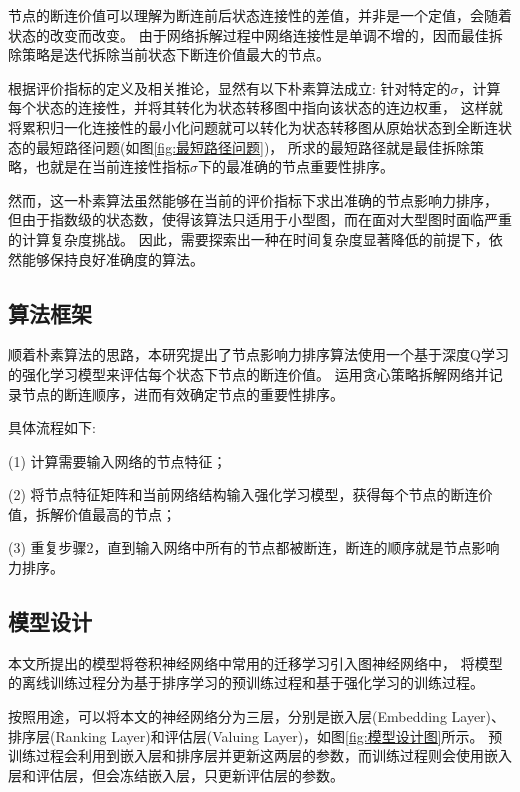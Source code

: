\documentclass[twocolumn]{morningstar}
\begin{document}
节点的断连价值可以理解为断连前后状态连接性的差值，并非是一个定值，会随着状态的改变而改变。
由于网络拆解过程中网络连接性是单调不增的，因而最佳拆除策略是迭代拆除当前状态下断连价值最大的节点。



根据评价指标的定义及相关推论，显然有以下朴素算法成立: 
针对特定的$\sigma$，计算每个状态的连接性，并将其转化为状态转移图中指向该状态的连边权重，
这样就将累积归一化连接性的最小化问题就可以转化为状态转移图从原始状态到全断连状态的最短路径问题(如图\ref{fig:最短路径问题})，
所求的最短路径就是最佳拆除策略，也就是在当前连接性指标$\sigma$下的最准确的节点重要性排序。


然而，这一朴素算法虽然能够在当前的评价指标下求出准确的节点影响力排序，
但由于指数级的状态数，使得该算法只适用于小型图，而在面对大型图时面临严重的计算复杂度挑战。
因此，需要探索出一种在时间复杂度显著降低的前提下，依然能够保持良好准确度的算法。


\subsection{算法框架}\label{sec:AlgorithmFramework}

顺着朴素算法的思路，本研究提出了节点影响力排序算法使用一个基于深度Q学习的强化学习模型来评估每个状态下节点的断连价值。
运用贪心策略拆解网络并记录节点的断连顺序，进而有效确定节点的重要性排序。

具体流程如下: 

(1) 计算需要输入网络的节点特征；

(2) 将节点特征矩阵和当前网络结构输入强化学习模型，获得每个节点的断连价值，拆解价值最高的节点；

(3) 重复步骤2，直到输入网络中所有的节点都被断连，断连的顺序就是节点影响力排序。


\subsection{模型设计}\label{sec:ModelDesign}

本文所提出的模型将卷积神经网络中常用的迁移学习引入图神经网络中，
将模型的离线训练过程分为基于排序学习的预训练过程和基于强化学习的训练过程。




按照用途，可以将本文的神经网络分为三层，分别是嵌入层(Embedding Layer)、排序层(Ranking Layer)和评估层(Valuing Layer)，如图\ref{fig:模型设计图}所示。
预训练过程会利用到嵌入层和排序层并更新这两层的参数，而训练过程则会使用嵌入层和评估层，但会冻结嵌入层，只更新评估层的参数。
\end{document}
